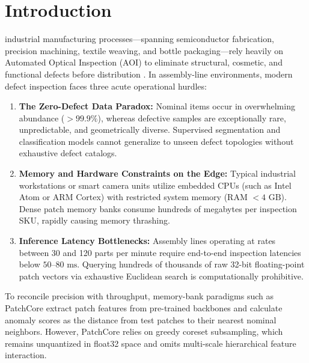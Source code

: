 \documentclass[10pt,journal,compsoc]{IEEEtran}
\begin{document}
\maketitle
\IEEEdisplaynontitleabstractindextext
\IEEEpeerreviewmaketitle

\section{Introduction}
 industrial manufacturing processes—spanning semiconductor fabrication, precision machining, textile weaving, and bottle packaging—rely heavily on Automated Optical Inspection (AOI) to eliminate structural, cosmetic, and functional defects before distribution \cite{bergmann2019mvtec}. In assembly-line environments, modern defect inspection faces three acute operational hurdles:

\begin{enumerate}
    \item \textbf{The Zero-Defect Data Paradox:} Nominal items occur in overwhelming abundance ($>99.9\%$), whereas defective samples are exceptionally rare, unpredictable, and geometrically diverse. Supervised segmentation and classification models cannot generalize to unseen defect topologies without exhaustive defect catalogs.
    \item \textbf{Memory and Hardware Constraints on the Edge:} Typical industrial workstations or smart camera units utilize embedded CPUs (such as Intel Atom or ARM Cortex) with restricted system memory (RAM $< 4\text{ GB}$). Dense patch memory banks consume hundreds of megabytes per inspection SKU, rapidly causing memory thrashing.
    \item \textbf{Inference Latency Bottlenecks:} Assembly lines operating at rates between 30 and 120 parts per minute require end-to-end inspection latencies below $50\text{--}80\text{ ms}$. Querying hundreds of thousands of raw 32-bit floating-point patch vectors via exhaustive Euclidean search is computationally prohibitive.
\end{enumerate}

To reconcile precision with throughput, memory-bank paradigms such as PatchCore \cite{roth2022towards} extract patch features from pre-trained backbones and calculate anomaly scores as the distance from test patches to their nearest nominal neighbors. However, PatchCore relies on greedy coreset subsampling, which remains unquantized in float32 space and omits multi-scale hierarchical feature interaction.
\end{document}
